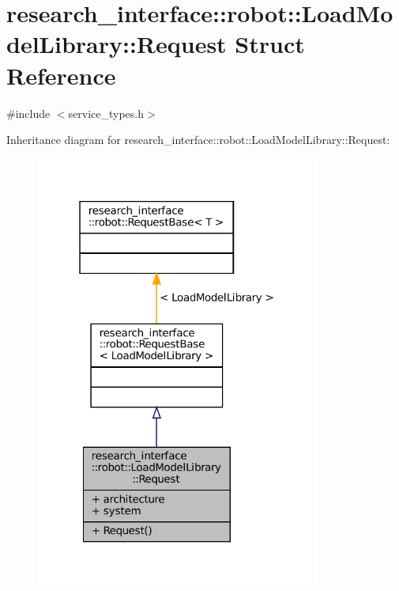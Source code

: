 \hypertarget{structresearch__interface_1_1robot_1_1LoadModelLibrary_1_1Request}{}\section{research\+\_\+interface\+:\+:robot\+:\+:Load\+Model\+Library\+:\+:Request Struct Reference}
\label{structresearch__interface_1_1robot_1_1LoadModelLibrary_1_1Request}


{\ttfamily \#include $<$service\+\_\+types.\+h$>$}



Inheritance diagram for research\+\_\+interface\+:\+:robot\+:\+:Load\+Model\+Library\+:\+:Request\+:
\nopagebreak
\begin{figure}[H]
\begin{center}
\leavevmode
\includegraphics[width=265pt]{structresearch__interface_1_1robot_1_1LoadModelLibrary_1_1Request__inherit__graph}
\end{center}
\end{figure}


